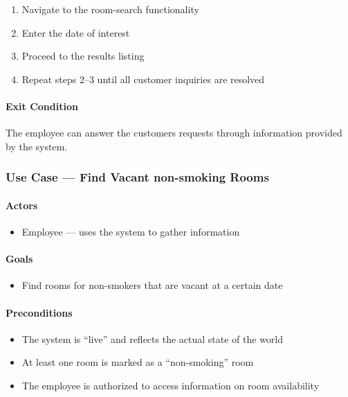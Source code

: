 \begin{enumerate}
\def\labelenumi{\arabic{enumi}.}
\tightlist
\item
  Navigate to the room-search functionality
\item
  Enter the date of interest
\item
  Proceed to the results listing
\item
  Repeat steps 2--3 until all customer inquiries are resolved
\end{enumerate}

\paragraph{Exit Condition}

The employee can answer the customers requests through information
provided by the system.

\subsubsection{Use Case --- Find Vacant non-smoking Rooms}\label{usecase2}

\paragraph{Actors}

\begin{itemize}
\tightlist
\item
  Employee --- uses the system to gather information
\end{itemize}

\paragraph{Goals}

\begin{itemize}
\tightlist
\item
  Find rooms for non-smokers that are vacant at a certain date
\end{itemize}

\paragraph{Preconditions}

\begin{itemize}
\tightlist
\item
  The system is ``live'' and reflects the actual state of the world
\item
  At least one room is marked as a ``non-smoking'' room
\item
  The employee is authorized to access information on room availability
\end{itemize}

